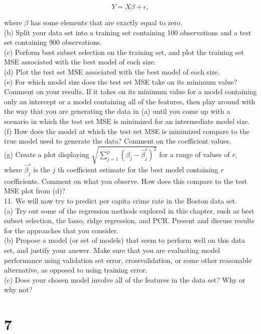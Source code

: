 \documentclass[10pt]{article}
\begin{document}
$$
Y=X \beta+\epsilon,
$$

where $\beta$ has some elements that are exactly equal to zero.\\
(b) Split your data set into a training set containing 100 observations and a test set containing 900 observations.\\
(c) Perform best subset selection on the training set, and plot the training set MSE associated with the best model of each size.\\
(d) Plot the test set MSE associated with the best model of each size.\\
(e) For which model size does the test set MSE take on its minimum value? Comment on your results. If it takes on its minimum value for a model containing only an intercept or a model containing all of the features, then play around with the way that you are generating the data in (a) until you come up with a scenario in which the test set MSE is minimized for an intermediate model size.\\
(f) How does the model at which the test set MSE is minimized compare to the true model used to generate the data? Comment on the coefficient values.\\
(g) Create a plot displaying $\sqrt{\sum_{j=1}^{p}\left(\beta_{j}-\hat{\beta}_{j}^{r}\right)^{2}}$ for a range of values of $r$, where $\hat{\beta}_{j}^{r}$ is the $j$ th coefficient estimate for the best model containing $r$ coefficients. Comment on what you observe. How does this compare to the test MSE plot from (d)?\\
11. We will now try to predict per capita crime rate in the Boston data set.\\
(a) Try out some of the regression methods explored in this chapter, such as best subset selection, the lasso, ridge regression, and PCR. Present and discuss results for the approaches that you consider.\\
(b) Propose a model (or set of models) that seem to perform well on this data set, and justify your answer. Make sure that you are evaluating model performance using validation set error, crossvalidation, or some other reasonable alternative, as opposed to using training error.\\
(c) Does your chosen model involve all of the features in the data set? Why or why not?

\section*{7}
\end{document}
